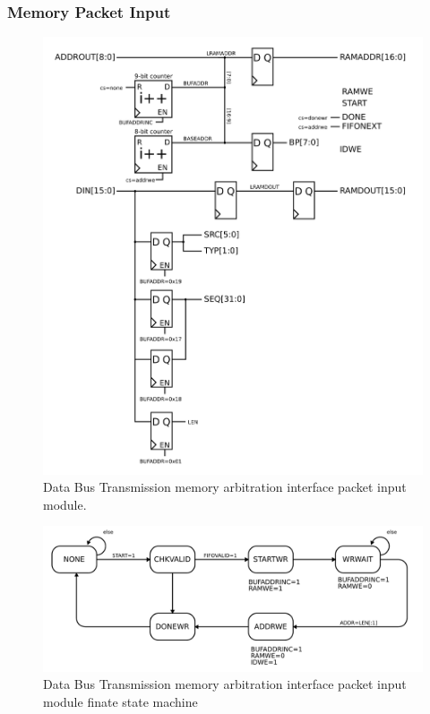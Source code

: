\subsubsection{Memory Packet Input}
\begin{figure}
\begin{centering}
\includegraphics[scale=0.8]{memarbit.pktinput.svg}
\end{centering}
\caption{Data Bus Transmission memory arbitration interface packet input module.}
\label{memarbit.pktinput}
\end{figure}

\begin{figure}
\begin{centering}
\includegraphics[scale=0.8]{memarbit.pktinput.fsm.svg}
\end{centering}
\caption{Data Bus Transmission memory arbitration interface packet input module finate state machine} 
\label{memarbit.pktinput.fsm}
\end{figure}


